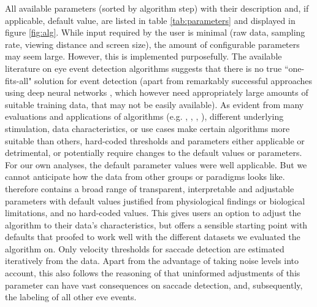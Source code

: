 All available parameters (sorted by algorithm step) with their description and, if applicable, default value, are listed in table \ref{tab:parameters} and displayed in figure \ref{fig:alg}. While input required by the user is minimal (raw data, sampling rate, viewing distance and screen size), the amount of configurable parameters may seem large. However, this is implemented purposefully.
The available literature on eye event detection algorithms suggests that there is no true ``one-fits-all" solution for event detection (apart from remarkably successful approaches using deep neural networks \citep{Startsev2018}, which however need appropriately large amounts of suitable training data, that may not be easily available). As evident from many evaluations and applications of algorithms (e.g. \cite{Andersson2017}, \cite{Larsson2013}, \cite{Zemblys2018}, \cite{5523936}), different underlying stimulation, data characteristics, or use cases make certain algorithms more suitable than others, hard-coded thresholds and parameters either applicable or detrimental, or potentially require changes to the default values or parameters. For our own analyses, the default parameter values were well applicable. But we cannot anticipate how the data from other groups or paradigms looks like. \remodnav therefore contains a broad range of transparent, interpretable and adjustable parameters with default values justified from physiological findings or biological limitations, and no hard-coded values. This gives users an option to adjust the algorithm to their data's characteristics, but offers a sensible starting point with defaults that proofed to work well with the different datasets we evaluated the algorithm on. Only velocity thresholds for saccade detection are estimated iteratively from the data. Apart from the advantage of taking noise levels into account, this also follows the reasoning of \cite{Nystrom2010AnData} that uninformed adjustments of this parameter can have vast consequences on saccade detection, and, subsequently, the labeling of all other eve events.

